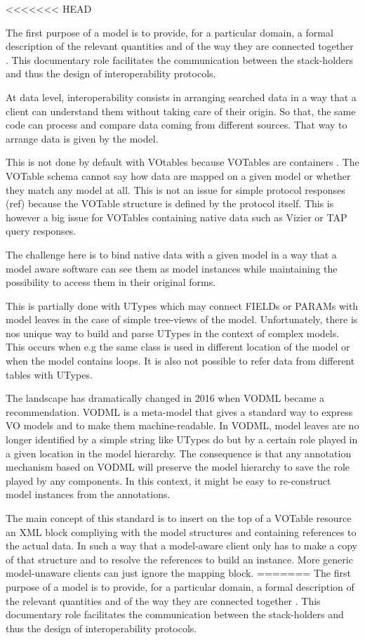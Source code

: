 <<<<<<< HEAD

The first purpose of a model is to provide, for a particular domain, a formal description of the relevant quantities and of the way they are connected together .
This documentary role facilitates the communication between the stack-holders and thus the design of interoperability protocols. 

At data level, interoperability consists in arranging searched data in a way that a client can understand them without taking care of their origin. 
So that, the same code can process and compare data coming from different sources.  That way to arrange data is given by the model.

This is not done by default with VOtables because VOTables are containers \citep{2019ivoa.spec.1021O}. 
The VOTable schema cannot say how data are mapped on a given model or whether they match any model at all. 
This is not an issue for simple protocol responses (ref) because the VOTable structure is defined by the protocol itself. 
This is however a big issue for VOTables containing native data such as Vizier  or TAP query responses.

The challenge here is to bind native data with a given model in a way that a model aware software can see them as 
model instances while maintaining the possibility to access them in their original forms.

This is partially done with UTypes which may connect FIELDs or PARAMs with model leaves in the case of simple tree-views of the model. 
Unfortunately, there is nos unique  way to build and parse UTypes in the context of complex models. 
This occurs when e.g the same class is used in different location of the model or when the model contains loops. 
It is also not possible to refer data from different tables with  UTypes.

The landscape has dramatically changed in 2016 when VODML \citep{2018ivoa.spec.0910L} became a recommendation. 
VODML is a meta-model that gives a standard way to express VO models and to make them machine-readable.
In VODML, model leaves are no longer identified by a simple string like UTypes do but by a certain role played in a given location in the model hierarchy.
The consequence is that any annotation mechanism based on VODML will preserve the model hierarchy to save the role played by any components. 
In this context, it might be easy to re-construct model instances from the annotations. 

The main concept of this standard is to insert on the  top of a VOTable resource an XML block compliying with the 
model structures and containing references to the actual data.
In such a way that a model-aware client only has to make a copy of that structure and to resolve the references  
to build an instance. More generic model-unaware clients can just ignore the mapping block. 
=======
The first purpose of a model is to provide,  for a particular domain, a formal description of the relevant quantities and of the way they are connected together .
This documentary role facilitates the communication between the stack-holders and thus the design of interoperability protocols. 

